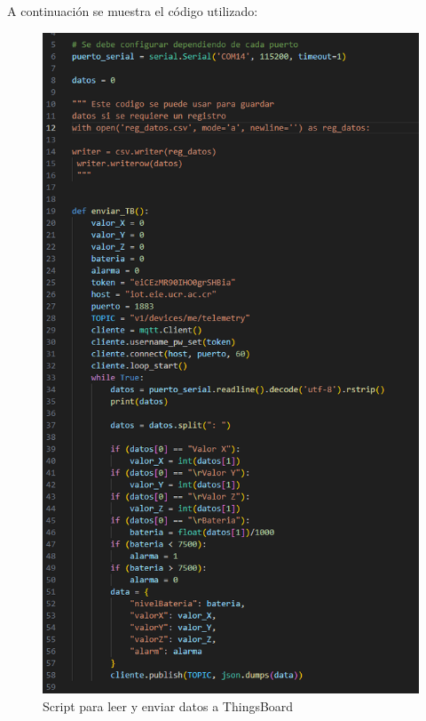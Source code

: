 A continuación se muestra el código utilizado: 
\begin{figure}[H]
    \centering
    \includegraphics[scale=.7]{Imagenes/python.png}
    \caption{Script para leer y enviar datos a ThingsBoard}
    \label{fig:py}
\end{figure}


